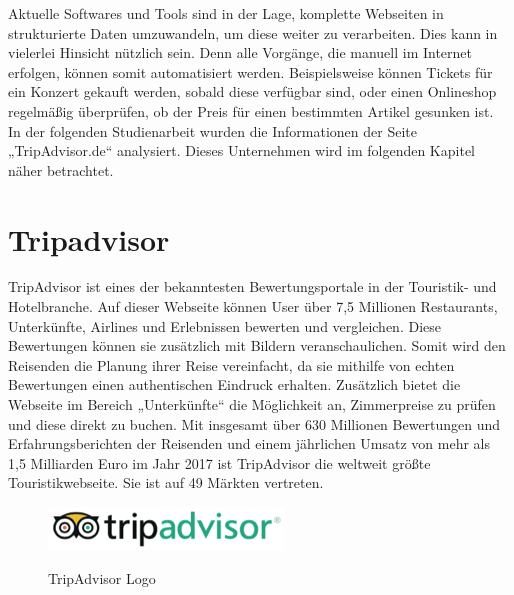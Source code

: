 \documentclass[a4paper,oneside,12pt]{report}
\begin{document}
				Aktuelle Softwares und Tools sind in der Lage, komplette Webseiten in strukturierte Daten umzuwandeln, um diese weiter zu verarbeiten. Dies kann in vielerlei Hinsicht nützlich sein. Denn alle Vorgänge, die manuell im Internet erfolgen, können somit automatisiert werden. Beispielsweise können Tickets für ein Konzert gekauft werden, sobald diese verfügbar sind, oder einen Onlineshop regelmäßig überprüfen, ob der Preis für einen bestimmten Artikel gesunken ist. \cite{bib-scrapehero}
				\\				
				In der folgenden Studienarbeit wurden die Informationen der Seite „TripAdvisor.de“ analysiert. Dieses Unternehmen wird im folgenden Kapitel näher betrachtet.
			
				
		\section[TripAdvisor - Johanna Sickendiek]{Tripadvisor}
	
			TripAdvisor ist eines der bekanntesten Bewertungsportale in der Touristik- und Hotelbranche.
			Auf dieser Webseite können User über 7,5 Millionen Restaurants, Unterkünfte, Airlines und Erlebnissen bewerten und vergleichen. Diese Bewertungen können sie zusätzlich mit Bildern veranschaulichen. Somit wird den Reisenden die Planung ihrer Reise vereinfacht, da sie mithilfe von echten Bewertungen einen authentischen Eindruck erhalten. 
			Zusätzlich bietet die Webseite im Bereich „Unterkünfte“ die Möglichkeit an, Zimmerpreise zu prüfen und diese direkt zu buchen. Mit insgesamt über 630 Millionen Bewertungen und Erfahrungsberichten der Reisenden und einem jährlichen Umsatz von mehr als 1,5 Milliarden Euro im Jahr 2017 \cite{bib-statista} ist TripAdvisor die weltweit größte Touristikwebseite. Sie ist auf 49 Märkten vertreten. \cite{bib-taMedia}
			
			\begin{figure}[H]
				\centering
				\begin{minipage}[b]{0.3\textwidth}
					\includegraphics[width=\textwidth]{Bilder/LogoTripadvisor.png}
				\end{minipage}
				\centering
				\caption[TripAdvisor Logo]{TripAdvisor Logo} \cite{bib-tripadvisorLogo}
				\label{pic-taLogo}
			\end{figure}
			
\end{document}
